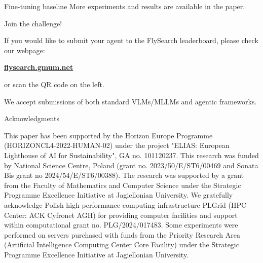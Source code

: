 \documentclass[final]{beamer}
\newlength{\colwidth}
\begin{document}
\begin{frame}[t]
\begin{columns}[t]
\begin{column}{\colwidth}
\begin{block}{Fine-tuning baseline}
More experiments and results are available in the paper.

\end{block}
\vspace{.5cm}

\begin{alertblock}{Join the challenge!}
\vspace{.5cm}
\begin{center}
 

If you would like to submit your agent to the FlySearch leaderboard, please check our webpage:\par
\textbf{\href{https://flysearch.gmum.net}{flysearch.gmum.net}} \par
or scan the QR code on the left.\par
We accept submissions of both standard VLMs/MLLMs and agentic frameworks.
\end{center}
\end{alertblock}

\vspace{.5cm}

\begin{block}{Acknowledgments}

\footnotesize{
This paper has been supported by the Horizon Europe Programme (HORIZONCL4-2022-HUMAN-02) under the project "ELIAS: European Lighthouse of AI for Sustainability", GA no. 101120237. This research was funded by National Science Centre, Poland (grant no. 2023/50/E/ST6/00469 and Sonata Bis grant no 2024/54/E/ST6/00388).
The research was supported by a grant from the Faculty of Mathematics and Computer Science under the
Strategic Programme Excellence Initiative at Jagiellonian University. We gratefully acknowledge Polish high-performance computing infrastructure PLGrid (HPC Center: ACK Cyfronet AGH) for providing computer facilities and support within computational grant no. PLG/2024/017483. Some experiments were performed on servers purchased with funds from the Priority Research Area (Artificial Intelligence Computing Center Core Facility) under the Strategic Programme Excellence Initiative at Jagiellonian University.
}
\end{block}

\begin{block}

\begin{center}
\vspace{-2ex}


\end{center}
\end{block}
\end{column}
\end{columns}
\end{frame}
\end{document}
